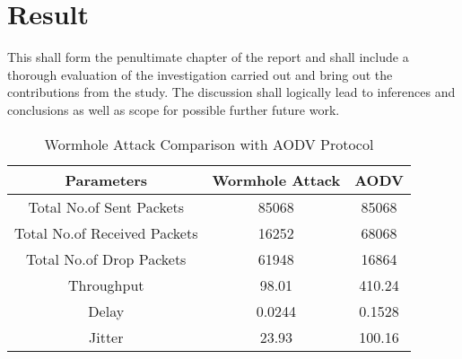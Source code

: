 \chapter{Result}
This shall form the penultimate chapter of the report and shall include a thorough evaluation
of the investigation carried out and bring out the contributions from the study. The discussion
shall logically lead to inferences and conclusions as well as scope for possible further future
work.\\

\begin{table}[h!]
\centering
\begin{tabular}{|c|c|c|}
\hline \textbf{Parameters} & \textbf{Wormhole Attack}  & \textbf{AODV} \\ 
\hline Total No.of Sent Packets & 85068 & 85068  \\ 
\hline Total No.of Received Packets & 16252 & 68068  \\ 
\hline Total No.of Drop Packets & 61948 & 16864 \\ 
\hline Throughput & 98.01 & 410.24 \\ 
\hline Delay & 0.0244 & 0.1528  \\ 
\hline Jitter & 23.93 & 100.16 \\ 
\hline 
\end{tabular} 
\caption{Wormhole Attack Comparison with AODV Protocol}
\label{Wormhole Attack Comparison with AODV Protocol}
\end{table}

